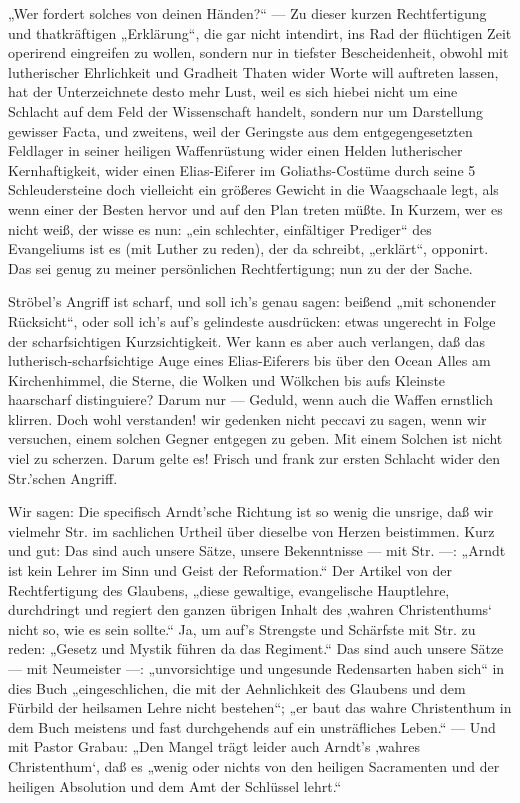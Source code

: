 „Wer fordert solches von deinen Händen?“ — Zu dieser kurzen Rechtfertigung und thatkräftigen
„Erklärung“, die gar nicht intendirt, ins Rad der flüchtigen Zeit operirend eingreifen zu wollen,
sondern nur in tiefster Bescheidenheit, obwohl mit lutherischer Ehrlichkeit und Gradheit Thaten wider
Worte will auftreten lassen, hat der Unterzeichnete desto mehr Lust, weil es sich hiebei nicht um eine
Schlacht auf dem Feld der Wissenschaft handelt, sondern nur um Darstellung gewisser Facta, und zweitens,
weil der Geringste aus dem entgegengesetzten Feldlager in seiner heiligen Waffenrüstung wider einen
Helden lutherischer Kernhaftigkeit, wider einen Elias-Eiferer im Goliaths-Costüme
durch seine 5 Schleudersteine doch vielleicht ein größeres Gewicht in
die Waagschaale legt, als wenn einer der Besten hervor und auf den Plan treten müßte. In Kurzem, wer
es nicht weiß, der wisse es nun: „ein schlechter, einfältiger Prediger“ des Evangeliums ist es
(mit Luther zu reden), der da schreibt, „erklärt“, opponirt. Das sei genug zu meiner persönlichen
Rechtfertigung; nun zu der der Sache.

Ströbel’s Angriff ist scharf, und soll ich’s genau sagen: beißend „mit schonender Rücksicht“, oder
soll ich’s auf’s gelindeste ausdrücken: etwas ungerecht in Folge der scharfsichtigen Kurzsichtigkeit. Wer
kann es aber auch verlangen, daß das lutherisch-scharfsichtige Auge eines Elias-Eiferers bis über
den Ocean Alles am Kirchenhimmel, die Sterne, die Wolken und Wölkchen bis aufs Kleinste haarscharf
distinguiere? Darum nur — Geduld, wenn auch die Waffen ernstlich klirren. Doch wohl verstanden! wir
gedenken nicht peccavi zu sagen, wenn wir versuchen, einem solchen Gegner entgegen zu geben. Mit einem
Solchen ist nicht viel zu scherzen. Darum gelte es! Frisch und frank zur ersten Schlacht wider den
Str.’schen Angriff.

Wir sagen: Die specifisch Arndt’sche Richtung ist so wenig die unsrige, daß wir vielmehr Str. im
sachlichen Urtheil über dieselbe von Herzen beistimmen. Kurz und gut: Das sind auch unsere Sätze,
unsere Bekenntnisse — mit Str. —: „Arndt ist kein Lehrer im Sinn und Geist der Reformation.“ Der
Artikel von der Rechtfertigung des Glaubens, „diese gewaltige, evangelische Hauptlehre, durchdringt und
regiert den ganzen übrigen Inhalt des ‚wahren Christenthums‘ nicht so, wie es sein sollte.“ Ja, um
auf’s Strengste und Schärfste mit Str. zu reden: „Gesetz und Mystik führen da das Regiment.“ Das
sind auch unsere Sätze — mit Neumeister —: „unvorsichtige und ungesunde Redensarten haben sich“
in dies Buch „eingeschlichen, die mit der Aehnlichkeit des Glaubens und dem Fürbild der heilsamen
Lehre nicht bestehen“; „er baut das wahre Christenthum in dem Buch meistens und fast durchgehends
auf ein unsträfliches Leben.“ — Und mit Pastor Grabau: „Den Mangel trägt leider auch Arndt’s
‚wahres Christenthum‘, daß es „wenig oder nichts von den heiligen Sacramenten und der heiligen
Absolution und dem Amt der Schlüssel lehrt.“

